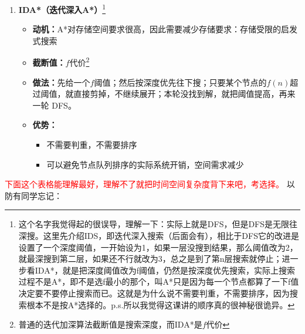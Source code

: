 \documentclass[../main.tex]{subfiles}
\begin{document}
\begin{enumerate}
\begin{itemize}
        
    \end{itemize}

    \item \textbf{IDA*（迭代深入A*）}\footnote{这个名字我觉得起的很误导，理解一下：实际上就是DFS，但是DFS是无限往深搜。这里先介绍IDS，即迭代深入搜索（后面会有），相比于DFS它的改进是设置了一个深度阈值，一开始设为1，如果一层没搜到结果，那么阈值改为2，就最深搜到第二层，如果还不行就改为3，总之是到了第n层搜索就停止；进一步看IDA*，就是把深度阈值改为f阈值，仍然是按深度优先搜索，实际上搜索过程不是A*，即不是选f最小的那个，叫A*只是因为每一个节点都算了一下f值决定要不要停止搜索而已。这就是为什么说不需要判重，不需要排序，因为搜索根本不是按A*选择的。p.s.所以我觉得这课讲的顺序真的很神秘很诡异。}
    \begin{itemize}
        \item \textbf{动机：}A*对存储空间要求很高，因此需要减少存储要求：存储受限的启发式搜索
        \item \textbf{截断值：}$f$代价\footnote{普通的迭代加深算法截断值是搜索深度，而IDA*是$f$代价}
        \item \textbf{做法：}先给一个$ f $阈值；然后按深度优先往下搜；只要某个节点的$ f(n) $超过阈值，就直接剪掉，不继续展开；本轮没找到解，就把阈值提高，再来一轮 DFS。
        \item \textbf{优势：}
        \begin{itemize}
            \item 不需要判重，不需要排序
            \item 可以避免节点队列排序的实际系统开销，空间需求减少
        \end{itemize}
    \end{itemize}
\end{enumerate}
\textcolor{red}{下面这个表格能理解最好，理解不了就把时间空间复杂度背下来吧，考选择。}
以防有同学忘记：
\end{document}

